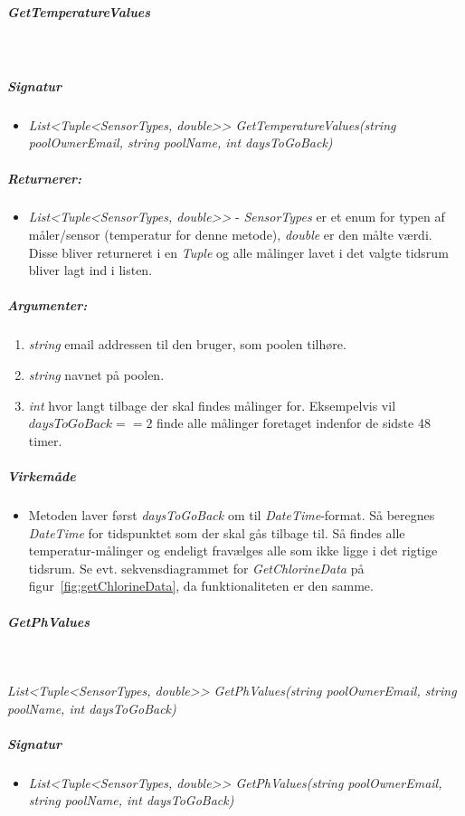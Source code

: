 \subparagraph{GetTemperatureValues}\ %


\subparagraph{Signatur}
\begin{itemize}
	\item \textit{List<Tuple<SensorTypes, double>> GetTemperatureValues(string poolOwnerEmail, string poolName, int daysToGoBack)}
\end{itemize}

\subparagraph{Returnerer:}
\begin{itemize}
	\item \textit{List<Tuple<SensorTypes, double>>} - \textit{SensorTypes} er et enum for typen af måler/sensor (temperatur for denne metode), \textit{double} er den målte værdi. Disse bliver returneret i en \textit{Tuple} og alle målinger lavet i det valgte tidsrum bliver lagt ind i listen.
\end{itemize}

\subparagraph{Argumenter:}
\begin{enumerate}
	\item \textit{string} email addressen til den bruger, som poolen tilhøre.
	\item \textit{string} navnet på poolen.
	\item \textit{int} hvor langt tilbage der skal findes målinger for. Eksempelvis vil $daysToGoBack == 2$ finde alle målinger foretaget indenfor de sidste 48 timer.
\end{enumerate}

\subparagraph{Virkemåde}
\begin{itemize}
	\item Metoden laver først \textit{daysToGoBack} om til \textit{DateTime}-format. Så beregnes \textit{DateTime} for tidspunktet som der skal gås tilbage til. Så findes alle temperatur-målinger og endeligt fravælges alle som ikke ligge i det rigtige tidsrum. Se evt. sekvensdiagrammet for \textit{GetChlorineData} på figur~\ref{fig:getChlorineData}, da funktionaliteten er den samme.
\end{itemize}


\subparagraph{GetPhValues}\ %

\textit{List<Tuple<SensorTypes, double>> GetPhValues(string poolOwnerEmail, string poolName, int daysToGoBack)}


\subparagraph{Signatur}
\begin{itemize}
	\item \textit{List<Tuple<SensorTypes, double>> GetPhValues(string poolOwnerEmail, string poolName, int daysToGoBack)}
\end{itemize}

